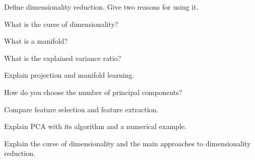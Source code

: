 \begin{iq}
\item \twom Define dimensionality reduction. Give two reasons for using it.
\item \twom What is the curse of dimensionality?
\item \twom What is a manifold?
\item \twom What is the explained variance ratio?
\item \fivem Explain projection and manifold learning.
\item \fivem How do you choose the number of principal components?
\item \fivem Compare feature selection and feature extraction.
\item \tenm Explain PCA with its algorithm and a numerical example.
\item \tenm Explain the curse of dimensionality and the main approaches to dimensionality reduction.
\end{iq}

